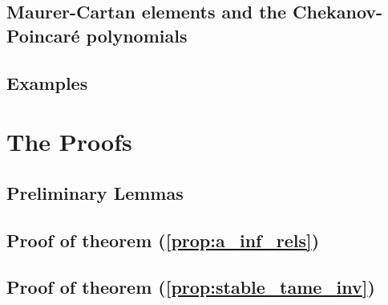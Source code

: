     \section{Maurer-Cartan elements and the Chekanov-Poincar\'{e} polynomials}
    

    \section{Examples} %
 
    \chapter{The Proofs}
    \label{chap:proofs}

    
 
    \section{Preliminary Lemmas}
    
    
    \section{Proof of theorem (\ref{prop:a_inf_rels})}
    
    
    \section{Proof of theorem (\ref{prop:stable_tame_inv})}
    
    
    

